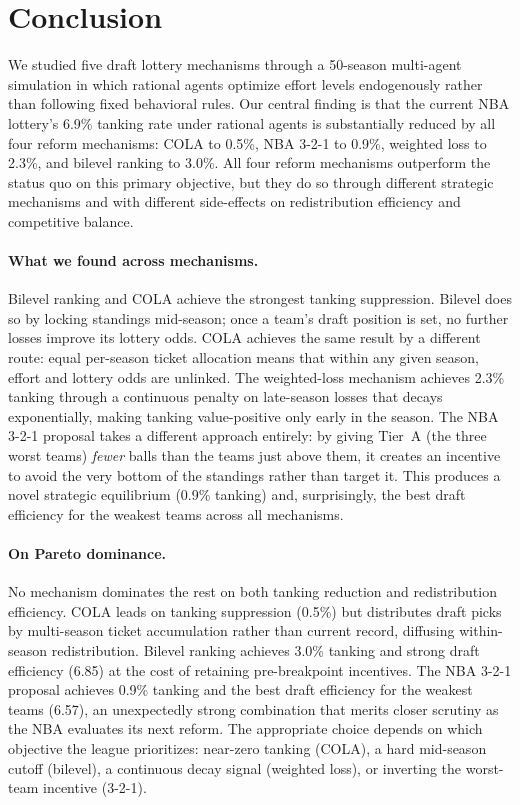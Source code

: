 \documentclass{article}
\begin{document}

\section{Conclusion}

We studied five draft lottery mechanisms through a 50-season multi-agent
simulation in which rational agents optimize effort levels endogenously
rather than following fixed behavioral rules.
Our central finding is that the current NBA lottery's 6.9\% tanking rate
under rational agents is substantially reduced by all four reform mechanisms:
COLA to 0.5\%, NBA 3-2-1 to 0.9\%, weighted loss to 2.3\%, and bilevel
ranking to 3.0\%.
All four reform mechanisms outperform the status quo on this primary objective,
but they do so through different strategic mechanisms and with different
side-effects on redistribution efficiency and competitive balance.

\paragraph{What we found across mechanisms.}
Bilevel ranking and COLA achieve the strongest tanking suppression.
Bilevel does so by locking standings mid-season; once a team's draft position
is set, no further losses improve its lottery odds.
COLA achieves the same result by a different route: equal per-season ticket
allocation means that within any given season, effort and lottery odds are
unlinked.
The weighted-loss mechanism achieves 2.3\% tanking through a continuous
penalty on late-season losses that decays exponentially, making tanking
value-positive only early in the season.
The NBA 3-2-1 proposal takes a different approach entirely: by giving Tier~A
(the three worst teams) \emph{fewer} balls than the teams just above them,
it creates an incentive to avoid the very bottom of the standings rather than
target it.
This produces a novel strategic equilibrium (0.9\% tanking) and, surprisingly,
the best draft efficiency for the weakest teams across all mechanisms.

\paragraph{On Pareto dominance.}
No mechanism dominates the rest on both tanking reduction and redistribution
efficiency.
COLA leads on tanking suppression (0.5\%) but distributes draft picks by
multi-season ticket accumulation rather than current record, diffusing
within-season redistribution.
Bilevel ranking achieves 3.0\% tanking and strong draft efficiency (6.85)
at the cost of retaining pre-breakpoint incentives.
The NBA 3-2-1 proposal achieves 0.9\% tanking and the best draft efficiency
for the weakest teams (6.57), an unexpectedly strong combination that merits
closer scrutiny as the NBA evaluates its next reform.
The appropriate choice depends on which objective the league prioritizes:
near-zero tanking (COLA), a hard mid-season cutoff (bilevel), a continuous
decay signal (weighted loss), or inverting the worst-team incentive (3-2-1).
\end{document}
